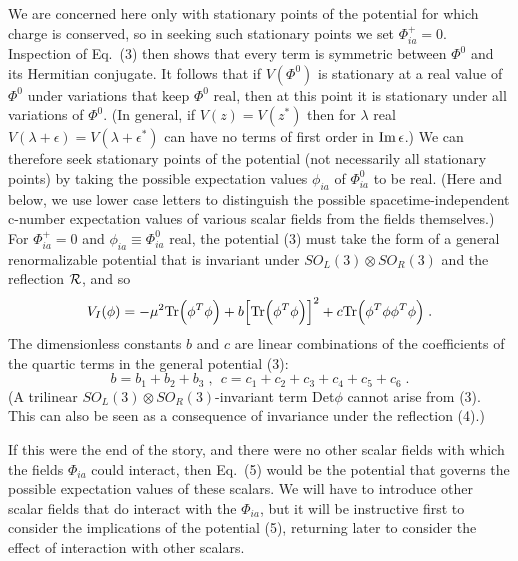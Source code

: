 \documentclass[12pt]{article}
\begin{document}
We are concerned here only with stationary points of the potential for which charge is conserved, so in seeking such stationary points we set $\Phi_{ia}^+=0$.  Inspection of Eq.~(3) then shows that every term is symmetric between $\Phi^0$ and its Hermitian conjugate.  It follows that  if $V(\Phi^0)$ is stationary at a real value of $\Phi^0$ under variations that keep 
$\Phi^0$ real, then  at this point it is stationary under all variations of $\Phi^0$.  (In general, if $V(z)=V(z^*)$ then for $\lambda$ real   $V(\lambda+\epsilon)=V(\lambda+\epsilon^*)$ can have no terms of first order in ${\rm Im}\,\epsilon$.) 
We can therefore seek stationary points of the potential (not necessarily all stationary points) by taking the possible  expectation values $\phi_{ia}$ of $\Phi^0_{ia}$ to be real.  (Here and below, we use lower case letters to distinguish the possible spacetime-independent c-number expectation values of various scalar fields from the fields themselves.)
 For $\Phi^+_{ia}=0$ and $\phi_{ia}\equiv \Phi^0_{ia}$ real, the potential (3) must take the form of a  general renormalizable potential that is  invariant under $SO_L(3)\otimes  SO_R(3)$ and the reflection ${\cal R}$, and so 
\begin{equation}
V_I(\phi)=-\mu^2{\rm Tr}\Big(\phi^T\phi\Big)+b\Big[{\rm Tr}\Big(\phi^T\phi\Big)\Big]^2+c{\rm Tr}\Big(\phi^T\phi\phi^T\phi\Big)\;.
\end{equation}
The dimensionless constants $b$ and $c$ are linear combinations of the coefficients of the quartic terms in the general potential (3):  
\begin{equation}
 b=b_1+b_2+b_3\;,~~c=c_1+c_2+c_3+c_4+c_5+c_6 \;.
\end{equation}
(A trilinear  $SO_L(3)\otimes  SO_R(3)$-invariant term Det$\phi$ cannot arise from (3).  This can also be seen as a consequence of  invariance under the reflection (4).)


If this were the end of the story, and there were no other scalar fields with which the fields $\Phi_{ia}$ could interact, then Eq.~(5) would be the potential that governs the possible expectation values of these scalars.  We will have to introduce other scalar fields that do interact with the 
$\Phi_{ia}$, but it will be instructive first to consider the implications of the potential (5), returning later to consider the effect of interaction with other scalars.
\end{document}
